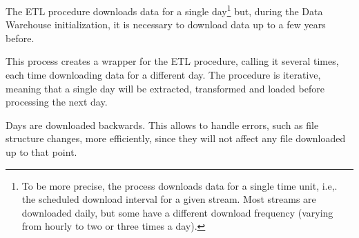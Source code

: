 The ETL procedure downloads data for a single day\footnote{
    To be more precise, the process downloads data for a single time unit, i.e,. the scheduled download interval for a given stream.
    Most streams are downloaded daily, but some have a different download frequency (varying from hourly to two or three times a day).
} but, during the Data Warehouse initialization, it is necessary to download data up to a few years before.

This process creates a wrapper for the ETL procedure, calling it several times, each time downloading data for a different day.
The procedure is iterative, meaning that a single day will be extracted, transformed and loaded before processing the next day.

Days are downloaded backwards.
This allows to handle errors, such as file structure changes, more efficiently, since they will not affect any file downloaded up to that point.
